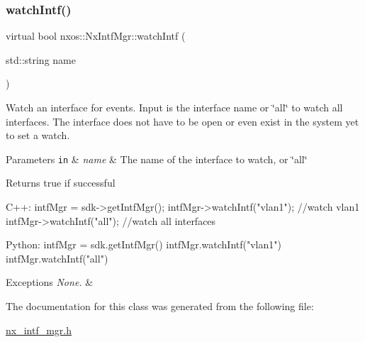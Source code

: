 \subsubsection{\texorpdfstring{watch\+Intf()}{watchIntf()}}
{\footnotesize\ttfamily virtual bool nxos\+::\+Nx\+Intf\+Mgr\+::watch\+Intf (\begin{DoxyParamCaption}\item[{std\+::string}]{name }\end{DoxyParamCaption})\hspace{0.3cm}{\ttfamily [pure virtual]}}

Watch an interface for events. Input is the interface name or \char`\"{}all\char`\"{} to watch all interfaces. The interface does not have to be open or even exist in the system yet to set a watch. 
\begin{DoxyParams}[1]{Parameters}
\mbox{\tt in}  & {\em name} & The name of the interface to watch, or \char`\"{}all\char`\"{} \\
\hline
\end{DoxyParams}
\begin{DoxyReturn}{Returns}
true if successful
\end{DoxyReturn}

\begin{DoxyCode}
C++:
      intfMgr = sdk->getIntfMgr();
      intfMgr->watchIntf(\textcolor{stringliteral}{"vlan1"});  \textcolor{comment}{//watch vlan1}
      intfMgr->watchIntf(\textcolor{stringliteral}{"all"});   \textcolor{comment}{//watch all interfaces}

Python:
      intfMgr = sdk.getIntfMgr()
      intfMgr.watchIntf(\textcolor{stringliteral}{"vlan1"}) 
      intfMgr.watchIntf(\textcolor{stringliteral}{"all"})
\end{DoxyCode}



\begin{DoxyExceptions}{Exceptions}
{\em None.} & \\
\hline
\end{DoxyExceptions}


The documentation for this class was generated from the following file\+:\begin{DoxyCompactItemize}
\item 
\mbox{\hyperlink{nx__intf__mgr_8h}{nx\+\_\+intf\+\_\+mgr.\+h}}\end{DoxyCompactItemize}
